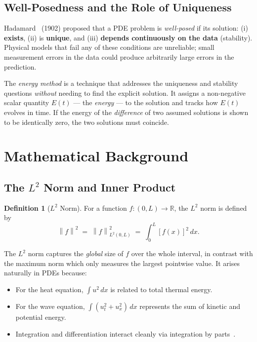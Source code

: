 \documentclass[12pt,a4paper]{article}
\theoremstyle{plain}
\theoremstyle{definition}
\newtheorem{definition}[theorem]{Definition}
\newcommand{\R}{\mathbb{R}}
\newcommand{\norm}[1]{\left\lVert #1 \right\rVert}
\begin{document}
\subsection{Well-Posedness and the Role of Uniqueness}

Hadamard~\cite{hadamard1902} (1902) proposed that a PDE problem is \emph{well-posed} if its
solution: (i) \textbf{exists}, (ii) is \textbf{unique}, and (iii)
\textbf{depends continuously on the data} (stability). Physical models that
fail any of these conditions are unreliable; small measurement errors in the
data could produce arbitrarily large errors in the prediction.

The \emph{energy method} is a technique that addresses the uniqueness and
stability questions \emph{without} needing to find the explicit solution. It
assigns a non-negative scalar quantity $E(t)$ — the \emph{energy} — to the
solution and tracks how $E(t)$ evolves in time. If the energy of the
\emph{difference} of two assumed solutions is shown to be identically zero,
the two solutions must coincide.

\section{Mathematical Background}
\label{sec:math}

\subsection{The $L^2$ Norm and Inner Product}

\begin{definition}[$L^2$ Norm]
For a function $f:(0,L)\to\R$, the $L^2$ norm is defined by
\begin{equation}
  \norm{f}^2 \;=\; \norm{f}^2_{L^2(0,L)} \;=\; \int_0^L [f(x)]^2\,dx.
  \label{eq:L2norm}
\end{equation}
\end{definition}

The $L^2$ norm captures the \emph{global} size of $f$ over the whole interval,
in contrast with the maximum norm which only measures the largest pointwise
value. It arises naturally in PDEs because:
\begin{itemize}
  \item For the heat equation, $\int u^2\,dx$ is related to total thermal energy.
  \item For the wave equation, $\int (u_t^2 + u_x^2)\,dx$ represents the sum
        of kinetic and potential energy.
  \item Integration and differentiation interact cleanly via integration by parts~\cite{Kreyszig}.
\end{itemize}
\end{document}
